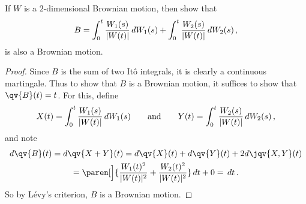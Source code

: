 \begin{example}
  If $W$ is a $2$-dimensional Brownian motion, then show that
  \begin{equation*}
    B = \int_0^t \frac{W_1(s)}{\lvert W(t)\rvert} \, dW_1(s)
	+ \int_0^t \frac{W_2(s)}{\lvert W(t)\rvert} \, dW_2(s)\,,
  \end{equation*}
  is also a Brownian motion.
\end{example}
\begin{proof}
  Since $B$ is the sum of two It\^o integrals, it is clearly a continuous martingale.
  Thus to show that $B$ is a Brownian motion, it suffices to show that $\qv{B}(t) = t$.
  For this, define
  \begin{equation*}
    X(t) = \int_0^t \frac{W_1(s)}{\lvert W(t)\rvert} \, dW_1(s)
    \qquad\text{and}\qquad
    Y(t) = \int_0^t \frac{W_2(s)}{\lvert W(t)\rvert} \, dW_2(s)\,,
  \end{equation*}
  and note
  \begin{multline*}
    d\qv{B}(t) = d\qv{X+Y}(t)
      = d\qv{X}(t) + d\qv{Y}(t) + 2d\jqv{X, Y}(t)
    \\
      = \paren[\Big]{\frac{W_1(t)^2}{\abs{W(t)}^2}
	+ \frac{W_2(t)^2}{\abs{W(t)}^2}} \, dt
	+ 0
      = \, dt\,.
  \end{multline*}
  So by L\'evy's criterion, $B$ is a Brownian motion.
\end{proof}

